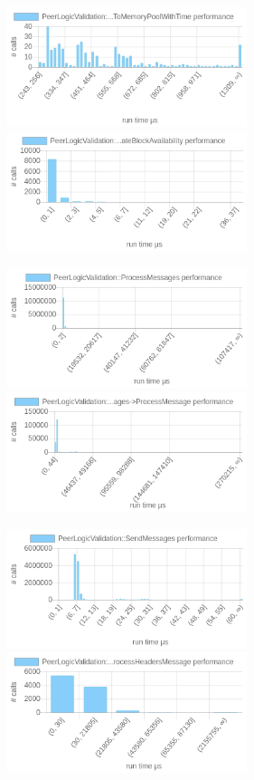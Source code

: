 \documentclass{article}
\begin{document}
\includegraphics[width=7cm]{images/mumbai/chartPeerLogicValidation_3A_3AProcessMessages-_3EProcessMessage-_3EAcceptToMemoryPoolWithTime.png}
\includegraphics[width=7cm]{images/mumbai/chartPeerLogicValidation_3A_3AProcessMessages-_3EProcessMessage-_3EProcessHeadersMessage-_3EUpdateBlockAvailability.png}

\includegraphics[width=7cm]{images/mumbai/chartPeerLogicValidation_3A_3AProcessMessages.png}
\includegraphics[width=7cm]{images/mumbai/chartPeerLogicValidation_3A_3AProcessMessages-_3EProcessMessage.png}

\includegraphics[width=7cm]{images/mumbai/chartPeerLogicValidation_3A_3ASendMessages.png}
\includegraphics[width=7cm]{images/mumbai/chartPeerLogicValidation_3A_3AProcessMessages-_3EProcessMessage-_3EProcessHeadersMessage.png}
\end{document}
